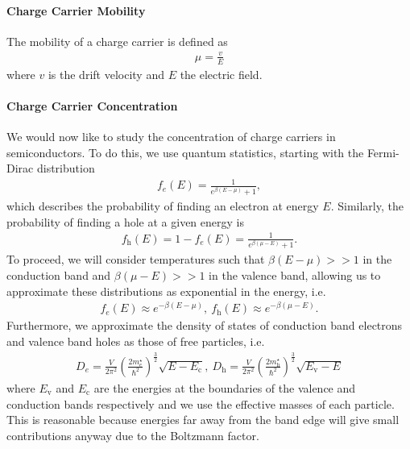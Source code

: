\paragraph{Charge Carrier Mobility}
The mobility of a charge carrier is defined as
\begin{align*}
	\mu = \frac{v}{E}
\end{align*}
where $v$ is the drift velocity and $E$ the electric field.

\paragraph{Charge Carrier Concentration}
We would now like to study the concentration of charge carriers in semiconductors. To do this, we use quantum statistics, starting with the Fermi-Dirac distribution
\begin{align*}
	f_{e}(E) = \frac{1}{e^{\beta(E - \mu)} + 1},
\end{align*}
which describes the probability of finding an electron at energy $E$. Similarly, the probability of finding a hole at a given energy is
\begin{align*}
	f_{\text{h}}(E) = 1 - f_{e}(E) = \frac{1}{e^{\beta(\mu - E)} + 1}.
\end{align*}
To proceed, we will consider temperatures such that $\beta(E - \mu) >> 1$ in the conduction band and $\beta(\mu - E) >> 1$ in the valence band, allowing us to approximate these distributions as exponential in the energy, i.e.
\begin{align*}
	f_{e}(E) \approx e^{-\beta(E - \mu)},\ f_{\text{h}}(E) \approx e^{-\beta(\mu - E)}.
\end{align*}
Furthermore, we approximate the density of states of conduction band electrons and valence band holes as those of free particles, i.e.
\begin{align*}
	D_{e} = \frac{V}{2\pi^{2}}\left(\frac{2m^{\star}_{e}}{\hbar^{2}}\right)^{\frac{3}{2}}\sqrt{E - E_{\text{c}}},\ D_{\text{h}} = \frac{V}{2\pi^{2}}\left(\frac{2m^{\star}_{\text{h}}}{\hbar^{2}}\right)^{\frac{3}{2}}\sqrt{E_{\text{v}} - E}
\end{align*}
where $E_{\text{v}}$ and $E_{\text{c}}$ are the energies at the boundaries of the valence and conduction bands respectively and we use the effective masses of each particle. This is reasonable because energies far away from the band edge will give small contributions anyway due to the Boltzmann factor.

